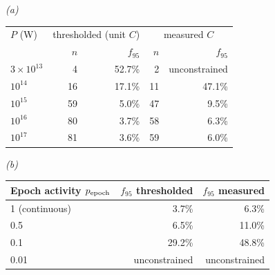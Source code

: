 \emph{(a)}\\[2pt]
\begin{tabular}{@{}lrrrr@{}}
\toprule
$P$ (W) & \multicolumn{2}{c}{thresholded (unit $C$)} &
\multicolumn{2}{c}{measured $C$} \\
 & $n$ & $f_{95}$ & $n$ & $f_{95}$ \\
\midrule
$3\times10^{13}$ & 4 & 52.7\% & 2 & unconstrained \\
$10^{14}$ & 16 & 17.1\% & 11 & 47.1\% \\
$10^{15}$ & 59 & 5.0\% & 47 & 9.5\% \\
$10^{16}$ & 80 & 3.7\% & 58 & 6.3\% \\
$10^{17}$ & 81 & 3.6\% & 59 & 6.0\% \\
\bottomrule
\end{tabular}

\smallskip
\emph{(b)}\\[2pt]
\begin{tabular}{@{}lrr@{}}
\toprule
Epoch activity $p_{\rm epoch}$ & $f_{95}$ thresholded & $f_{95}$ measured \\
\midrule
1 (continuous) & 3.7\% & 6.3\% \\
0.5 & 6.5\% & 11.0\% \\
0.1 & 29.2\% & 48.8\% \\
0.01 & unconstrained & unconstrained \\
\bottomrule
\end{tabular}
